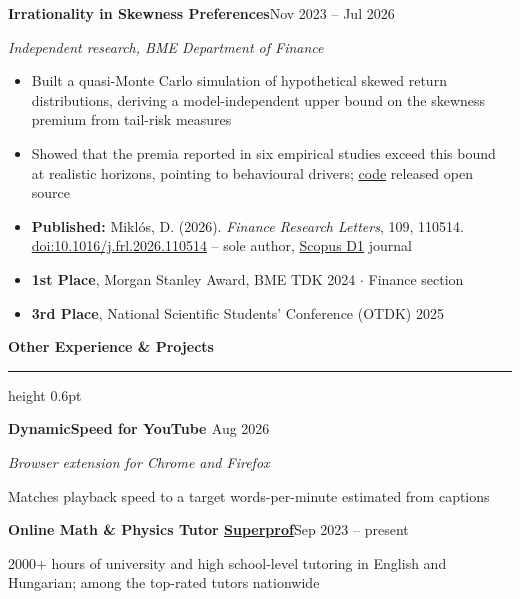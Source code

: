 \documentclass[10pt,a4paper]{article}
\newlength{\sidewidth}\setlength{\sidewidth}{0.27\textwidth}
\newlength{\colgap}\setlength{\colgap}{1.3em}
\newlength{\mainwidth}\setlength{\mainwidth}{\dimexpr\textwidth-\sidewidth-\colgap\relax}
\newcommand{\cvsection}[1]{%
    \vspace{0.25cm plus 1fill}%
    {\color{accent}\large\bfseries #1}\par\vspace{0.06cm}%
    {\color{accent}\hrule height 0.6pt}\vspace{0.16cm}%
}
\newcommand{\cventry}[4]{%
    {\bfseries #1}\hfill{\small\color{subtle}#2}\par
    {\itshape #3}\par
    \vspace{1pt}%
    #4%
    \par\vspace{0.12cm plus 0.5fill}%
}
\newenvironment{outcomes}{%
    \begin{itemize}[label={\color{accent}\small\faCaretRight}, leftmargin=1em, topsep=2pt]%
}{\end{itemize}}
\begin{document}
\begin{minipage}[t][\dimexpr\textheight-12pt\relax][s]{\mainwidth}
\cventry{Irrationality in Skewness Preferences}{Nov 2023 -- Jul 2026}
{Independent research, BME Department of Finance}
{\begin{itemize}
    \item Built a quasi-Monte Carlo simulation of hypothetical skewed return distributions, deriving a model-independent upper bound on the skewness premium from tail-risk measures
    \item Showed that the premia reported in six empirical studies exceed this bound at realistic horizons, pointing to behavioural drivers; \href{https://github.com/damjanmiklos/Irrationality_in_skewness_preferences_FRL}{code} released open source
\end{itemize}
\begin{outcomes}
    \item \textbf{Published:} Miklós, D. (2026). \textit{Finance Research Letters}, 109, 110514. \href{https://doi.org/10.1016/j.frl.2026.110514}{doi:10.1016/j.frl.2026.110514} -- sole author, \href{https://www.scopus.com/sourceid/15519}{Scopus D1} journal
    \item \textbf{1st Place}, Morgan Stanley Award, BME TDK 2024{\small\color{subtle} \;$\cdot$\; Finance section}
    \item \textbf{3rd Place}, National Scientific Students' Conference (OTDK) 2025
\end{outcomes}}

\cvsection{Other Experience \& Projects}

\cventry{DynamicSpeed for YouTube \href{https://github.com/damjanmiklos/dynamicspeed-for-youtube}{\faGithub} \href{https://chromewebstore.google.com/detail/dynamicspeed-for-youtube/hpbgddpjofgkedekcmkjannepmnfbpga}{\faChrome}}{Aug 2026} 
{Browser extension for Chrome and Firefox}
{Matches playback speed to a target words-per-minute estimated from captions}

\cventry{Online Math \& Physics Tutor {\href{https://www.superprof.hu/mechatronikus-hallgatokent-barkit-szivesen-tanitok-matek-fizikara-online-eddigi-ertekeleseim-alapjan-egyik-legjobban.html}{Superprof}}}{Sep 2023 -- present}
{}
{2000+ hours of university and high school-level tutoring in English and Hungarian; among the top-rated tutors nationwide}



\end{minipage}
\end{document}
